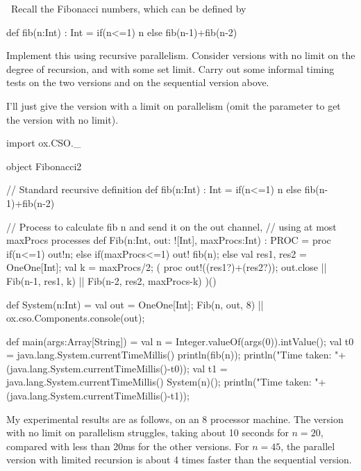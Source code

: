 \begin{question}
\Programming\ 
Recall the Fibonacci numbers, which can be defined by 
%
\begin{scala}
  def fib(n:Int) : Int = if(n<=1) n else fib(n-1)+fib(n-2)
\end{scala}
%
Implement this using recursive parallelism.  Consider versions with no limit
on the degree of recursion, and with some set limit.  Carry out some informal
timing tests on the two versions and on the sequential version above.
\end{question}


\begin{answer}
I'll just give the version with a limit on parallelism (omit the parameter
\SCALA{maxProcs} to get the version with no limit).
%
\begin{scala}
import ox.CSO._

object Fibonacci2{

  // Standard recursive definition
  def fib(n:Int) : Int = if(n<=1) n else fib(n-1)+fib(n-2)

  // Process to calculate fib n and send it on the out channel,
  // using at most maxProcs processes
  def Fib(n:Int, out: ![Int], maxProcs:Int) : PROC = proc{
    if(n<=1) out!n;
    else if(maxProcs<=1) out! fib(n);
    else{
      val res1, res2 = OneOne[Int];
      val k = maxProcs/2;
      ( proc{ out!((res1?)+(res2?)); out.close} || 
        Fib(n-1, res1, k) || Fib(n-2, res2, maxProcs-k)
      )()
    }
  }

  def System(n:Int) = {
    val out = OneOne[Int];
    Fib(n, out, 8) || ox.cso.Components.console(out);
  }

  def main(args:Array[String]) = {
    val n = Integer.valueOf(args(0)).intValue();
    val t0 = java.lang.System.currentTimeMillis()
    println(fib(n));
    println("Time taken: "+(java.lang.System.currentTimeMillis()-t0));
    val t1 = java.lang.System.currentTimeMillis()
    System(n)();
    println("Time taken: "+(java.lang.System.currentTimeMillis()-t1));
  }
}
\end{scala}

My experimental results are as follows, on an 8 processor machine.  The
version with no limit on parallelism struggles, taking about 10 seconds for $n
= 20$, compared with less than 20ms for the other versions.  For $n = 45$, the
parallel version with limited recursion is about 4 times faster than the
sequential version.
\end{answer}

